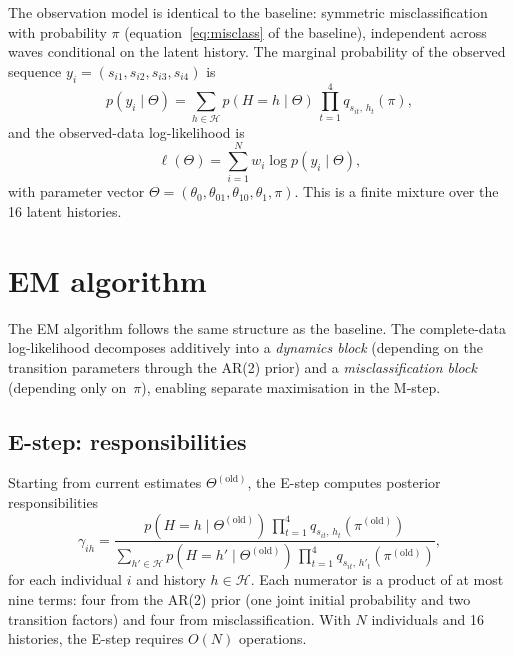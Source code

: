 \documentclass[12pt]{article}
\begin{document}
The observation model is identical to the baseline: symmetric
misclassification with probability $\pi$ (equation~\eqref{eq:misclass}
of the baseline), independent across waves conditional on the latent
history. The marginal probability of the observed sequence
$y_i = (s_{i1}, s_{i2}, s_{i3}, s_{i4})$ is
\begin{equation}
p(y_i \mid \Theta) = \sum_{h \in \mathcal{H}}
  p(H = h \mid \Theta)\,
  \prod_{t=1}^{4} q_{s_{it},\, h_t}(\pi),
\label{eq:ar2_marginal}
\end{equation}
and the observed-data log-likelihood is
\begin{equation}
\ell(\Theta) = \sum_{i=1}^{N} w_i \log p(y_i \mid \Theta),
\label{eq:ar2_obs_ll}
\end{equation}
with parameter vector
$\Theta = (\theta_0, \theta_{01}, \theta_{10}, \theta_1, \pi)$.
This is a finite mixture over the 16 latent histories.

\section{EM algorithm}
\label{sec:ar2_em}

The EM algorithm follows the same structure as the baseline. The
complete-data log-likelihood decomposes additively into a
\emph{dynamics block} (depending on the transition parameters through
the AR(2) prior) and a \emph{misclassification block} (depending only
on~$\pi$), enabling separate maximisation in the M-step.

\subsection{E-step: responsibilities}

Starting from current estimates $\Theta^{(\mathrm{old})}$, the E-step
computes posterior responsibilities
\begin{equation}
\gamma_{ih} = \frac{
  p(H = h \mid \Theta^{(\mathrm{old})})\,
  \prod_{t=1}^{4} q_{s_{it},\, h_t}(\pi^{(\mathrm{old})})
}{
  \sum_{h' \in \mathcal{H}}
  p(H = h' \mid \Theta^{(\mathrm{old})})\,
  \prod_{t=1}^{4} q_{s_{it},\, h'_t}(\pi^{(\mathrm{old})})
},
\label{eq:ar2_responsibility}
\end{equation}
for each individual $i$ and history $h \in \mathcal{H}$.
Each numerator is a product of at most nine terms: four from the AR(2)
prior (one joint initial probability and two transition factors) and
four from misclassification. With $N$ individuals and 16 histories, the
E-step requires $O(N)$ operations.
\end{document}
